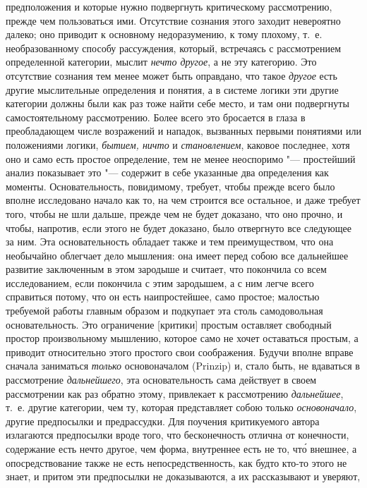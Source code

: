 предположения и которые нужно подвергнуть критическому рассмотрению, прежде чем
пользоваться ими. Отсутствие сознания этого заходит невероятно далеко; оно
приводит к основному недоразумению, к тому плохому, т.~е. необразованному
способу рассуждения, который, встречаясь с рассмотрением определенной
категории, мыслит {\em нечто другое}, а не эту категорию. Это отсутствие
сознания тем менее может быть оправдано, что такое {\em другое} есть другие
мыслительные определения и понятия, а в системе логики эти другие категории
должны были как раз тоже найти себе место, и там они подвергнуты
самостоятельному рассмотрению. Более всего это бросается в глаза в
преобладающем числе возражений и нападок, вызванных первыми понятиями или
положениями логики, {\em бытием, ничто} и {\em становлением}, каковое
последнее, хотя оно и само есть простое определение, тем не менее неоспоримо
"--- простейший анализ показывает это "--- содержит в себе указанные два
определения как моменты. Основательность, повидимому, требует, чтобы прежде
всего было вполне исследовано начало как то, на чем строится все остальное, и
даже требует того, чтобы не шли дальше, прежде чем не будет доказано, что оно
прочно, и чтобы, напротив, если этого не будет доказано, было отвергнуто все
следующее за ним. Эта основательность обладает также и тем преимуществом, что
она необычайно облегчает дело мышления: она имеет перед собою все дальнейшее
развитие заключенным в этом зародыше и считает, что покончила со всем
исследованием, если покончила с этим зародышем, а с ним легче всего справиться
потому, что он есть наипростейшее, само простое; малостью требуемой работы
главным образом и подкупает эта столь самодовольная основательность. Это
ограничение [критики] простым оставляет свободный простор произвольному
мышлению, которое само не хочет оставаться простым, а приводит относительно
этого простого свои соображения. Будучи вполне вправе сначала заниматься
{\em только} основоначалом (Prinzip) и, стало быть, не вдаваться в рассмотрение
{\em дальнейшего}, эта основательность сама действует в своем рассмотрении как
раз обратно этому, привлекает к рассмотрению {\em дальнейшее}, т.~е. другие
категории, чем ту, которая представляет собою только {\em основоначало}, другие
предпосылки и предрассудки. Для поучения критикуемого автора излагаются
предпосылки вроде того, что бесконечность отлична от конечности, содержание
есть нечто другое, чем форма, внутреннее есть не то, чт\'{о} внешнее, а
опосредствование также не есть непосредственность, как будто кто-то этого не
знает, и притом эти предпосылки не доказываются, а их рассказывают и уверяют,
